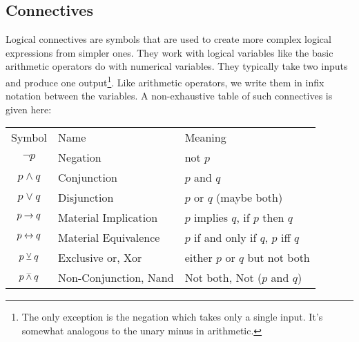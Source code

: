 


\subsection{Connectives}
Logical connectives are symbols that are used to create more complex logical expressions from simpler ones. They work with logical variables like the basic arithmetic operators do with numerical variables. They typically take two inputs and produce one output\footnote{The only exception is the negation which takes only a single input. It's somewhat analogous to the unary minus in arithmetic.}. Like arithmetic operators, we write them in infix notation between the variables. A non-exhaustive table of such connectives is given here:

\medskip
\begin{tabular}{c l l}
\label{Tab:LogicConnectives}
  Symbol           & Name                  & Meaning      \\
  $\neg p$         & Negation              & not $p$       \\
  $p \wedge q$     & Conjunction           & $p$ and $q$    \\
  $p \vee q$       & Disjunction           & $p$ or $q$ (maybe both)   \\
  $p \mathbin{\rightarrow} q$      & Material Implication  & $p$ implies $q$, if $p$ then $q$   \\  
  $p \mathbin{\leftrightarrow} q$    & Material Equivalence  & $p$ if and only if $q$, $p$ iff $q$   \\    
  $p \mathbin{\veebar} q$       & Exclusive or, Xor     & either $p$ or $q$ but not both   \\ 
  $p \mathbin{\barwedge} q$      & Non-Conjunction, Nand & Not both, Not ($p$ and $q$)   \\   
\end{tabular}
\medskip

